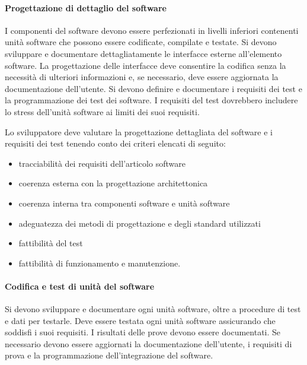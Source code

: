 \documentclass[../../norme-di-progetto.tex]{subfiles}
\begin{document}
\paragraph{Progettazione di dettaglio del software}%
\label{par:progettazione_di_dettaglio_del_software}

I componenti del software devono essere perfezionati in livelli inferiori contenenti unità software che possono essere codificate, compilate e testate. Si devono sviluppare e documentare dettagliatamente le interfacce esterne all'elemento software. La progettazione delle interfacce deve consentire la codifica senza la necessità di ulteriori informazioni e, se necessario, deve essere aggiornata la documentazione dell'utente. Si devono definire e documentare i requisiti dei test e la programmazione dei test dei software. I requisiti del test dovrebbero includere lo stress dell'unità software ai limiti dei suoi requisiti.

Lo sviluppatore deve valutare la progettazione dettagliata del software e i requisiti dei test tenendo conto dei criteri elencati di seguito:

\begin{itemize}
  \item tracciabilità dei requisiti dell'articolo software
  \item coerenza esterna con la progettazione architettonica
  \item coerenza interna tra componenti software e unità software
  \item adeguatezza dei metodi di progettazione e degli standard utilizzati
  \item fattibilità del test
  \item fattibilità di funzionamento e manutenzione.
\end{itemize}


\paragraph{Codifica e test di unità del software}%
\label{par:codifica_e_test_di_unita_del_software}

Si devono sviluppare e documentare ogni unità software, oltre a procedure di test e dati per testarle. Deve essere testata ogni unità software assicurando che soddisfi i suoi requisiti. I risultati delle prove devono essere documentati. Se necessario devono essere aggiornati la documentazione dell'utente, i requisiti di prova e la programmazione dell'integrazione del software.
\end{document}

